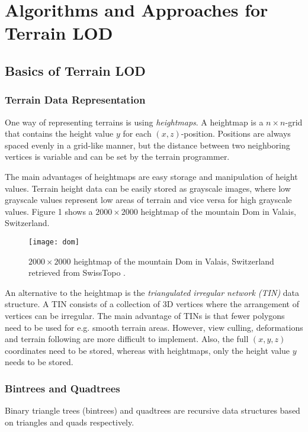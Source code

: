 \chapter{Algorithms and Approaches for Terrain LOD}
\section{Basics of Terrain LOD}
\subsection{Terrain Data Representation}
One way of representing terrains is using \textit{heightmaps}.
A heightmap is a $n\times n$-grid that contains 
the height value $y$ for each $(x,z)$-position.
Positions are always spaced evenly in a grid-like manner,
but the distance between two neighboring vertices is variable
and can be set by the terrain programmer.

The main advantages of heightmaps are
easy storage and manipulation of height values. %
Terrain height data can be easily stored as grayscale images,
where low grayscale values represent low areas of terrain and vice versa for
high grayscale values. Figure 1 shows a $2000 \times 2000$ heightmap of the mountain Dom in Valais, Switzerland.
\begin{figure}[H]
  \centering
  \texttt{[image: dom]}
  \caption{$2000 \times 2000$ heightmap of the mountain Dom in Valais, Switzerland retrieved from SwissTopo \cite{alti3d}.}
\end{figure}

An alternative to the heightmap is the \textit{triangulated irregular network (TIN)} data structure.
A TIN consists of a collection of 3D vertices where 
the arrangement of vertices can be irregular.
The main advantage of TINs is that fewer polygons need to be used for 
e.g. smooth terrain areas. However, view culling, deformations and terrain following are 
more difficult to implement. Also, the full $(x,y,z)$ coordinates need to be stored,
whereas with heightmaps, only the height value $y$ needs to be stored.

\subsection{Bintrees and Quadtrees}
Binary triangle trees (bintrees) and quadtrees are 
recursive data structures based on triangles and quads respectively.

